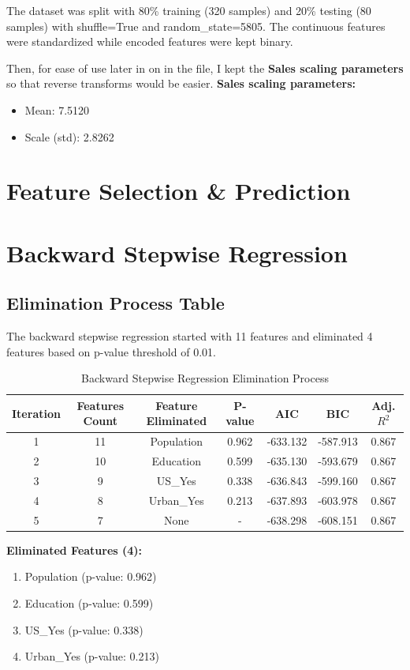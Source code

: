 \documentclass[12pt]{article}
\begin{document}
The dataset was split with 80\% training (320 samples) and 20\% testing (80 samples) with shuffle=True and random\_state=5805. The continuous features were standardized while encoded features were kept binary.


Then, for ease of use later in on in the file, I kept the \textbf{Sales scaling parameters} so that reverse transforms would be easier.
\textbf{Sales scaling parameters:}
\begin{itemize}
    \item Mean: 7.5120
    \item Scale (std): 2.8262
\end{itemize}

\section*{Feature Selection \& Prediction}

\section{Backward Stepwise Regression}

\subsection{Elimination Process Table}

The backward stepwise regression started with 11 features and eliminated 4 features based on p-value threshold of 0.01.
\begin{table}[H]
\centering
\caption{Backward Stepwise Regression Elimination Process}
\begin{tabular}{ccccccc}
\toprule
\textbf{Iteration} & \textbf{Features Count} & \textbf{Feature Eliminated} & \textbf{P-value} & \textbf{AIC} & \textbf{BIC} & \textbf{Adj. $R^2$} \\
\midrule
1 & 11 & Population & 0.962 & -633.132 & -587.913 & 0.867 \\
2 & 10 & Education & 0.599 & -635.130 & -593.679 & 0.867 \\
3 & 9 & US\_Yes & 0.338 & -636.843 & -599.160 & 0.867 \\
4 & 8 & Urban\_Yes & 0.213 & -637.893 & -603.978 & 0.867 \\
5 & 7 & None & - & -638.298 & -608.151 & 0.867 \\
\bottomrule
\end{tabular}
\end{table}

\textbf{Eliminated Features (4):}
\begin{enumerate}
    \item Population (p-value: 0.962)
    \item Education (p-value: 0.599)
    \item US\_Yes (p-value: 0.338)
    \item Urban\_Yes (p-value: 0.213)
\end{enumerate}
\end{document}
